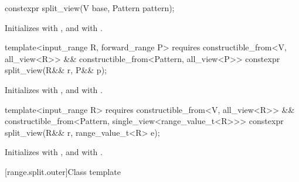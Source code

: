 %
\begin{itemdecl}
constexpr split_view(V base, Pattern pattern);
\end{itemdecl}

\begin{itemdescr}
\pnum
\effects
Initializes  with , and
 with .
\end{itemdescr}

%
\begin{itemdecl}
template<input_range R, forward_range P>
  requires constructible_from<V, all_view<R>> &&
           constructible_from<Pattern, all_view<P>>
constexpr split_view(R&& r, P&& p);
\end{itemdecl}

\begin{itemdescr}
\pnum
\effects
Initializes  with , and
 with .
\end{itemdescr}

%
\begin{itemdecl}
template<input_range R>
  requires constructible_from<V, all_view<R>> &&
           constructible_from<Pattern, single_view<range_value_t<R>>>
constexpr split_view(R&& r, range_value_t<R> e);
\end{itemdecl}

\begin{itemdescr}
\pnum
\effects
Initializes  with , and
 with .
\end{itemdescr}

[range.split.outer]{Class template }


